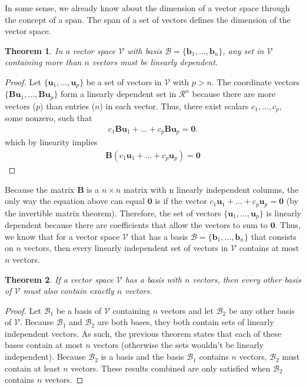 \documentclass[
]{book}
\newtheorem{theorem}{Theorem}[chapter]
\theoremstyle{definition}
\theoremstyle{definition}
\theoremstyle{definition}
\theoremstyle{definition}
\theoremstyle{remark}
\begin{document}
In some sense, we already know about the dimension of a vector space through the concept of a span. The span of a set of vectors defines the dimension of the vector space.

\begin{theorem}
In a vector space \(\mathcal{V}\) with basis \(\mathcal{B} = \{ \mathbf{b}_1, \ldots, \mathbf{b}_n\}\), any set in \(\mathcal{V}\) containing more than \(n\) vectors must be linearly dependent.
\end{theorem}

\begin{proof}
Let \(\{\mathbf{u}_1, \ldots, \mathbf{u}_p \}\) be a set of vectors in \(\mathcal{V}\) with \(p > n\). The coordinate vectors \(\{\mathbf{B} \mathbf{u}_1, \ldots, \mathbf{B} \mathbf{u}_p\}\) form a linearly dependent set in \(\mathcal{R}^n\) because there are more vectors (\(p\)) than entries (\(n\)) in each vector. Thus, there exist scalars \(c_1, \ldots, c_p\), some nonzero, such that
\[
\begin{aligned}
c_1 \mathbf{B} \mathbf{u}_1 + \ldots + c_p \mathbf{B} \mathbf{u}_p = \mathbf{0}.
\end{aligned}
\]
which by linearity implies
\[
\begin{aligned}
\mathbf{B} (c_1 \mathbf{u}_1 + \ldots + c_p \mathbf{u}_p) = \mathbf{0} 
\end{aligned}
\]
\end{proof}

Because the matrix \(\mathbf{B}\) is a \(n \times n\) matrix with n linearly independent columns, the only way the equation above can equal \(\mathbf{0}\) is if the vector \(c_1 \mathbf{u}_1 + \ldots + c_p \mathbf{u}_p = \mathbf{0}\) (by the invertible matrix theorem). Therefore, the set of vectors \(\{\mathbf{u}_1, \ldots, \mathbf{u}_p \}\) is linearly dependent because there are coefficients that allow the vectors to sum to \(\mathbf{0}\). Thus, we know that for a vector space \(\mathcal{V}\) that has a basis \({\mathcal{B} = \{ \mathbf{b}_1, \ldots, \mathbf{b}_n \}}\) that consists on \(n\) vectors, then every linearly independent set of vectors in \(\mathcal{V}\) contains at most \(n\) vectors.

\begin{theorem}
If a vector space \({\mathcal{V}}\) has a basis with \(n\) vectors, then every other basis of \({\mathcal{V}}\) must also contain exactly \(n\) vectors.
\end{theorem}

\begin{proof}
Let \(\mathcal{B}_1\) be a basis of \({\mathcal{V}}\) containing \(n\) vectors and let \(\mathcal{B}_2\) be any other basis of \({\mathcal{V}}\). Because \(\mathcal{B}_1\) and \(\mathcal{B}_2\) are both bases, they both contain sets of linearly independent vectors. As such, the previous theorem states that each of these bases contain at most \(n\) vectors (otherwise the sets wouldn't be linearly independent). Because \(\mathcal{B}_2\) is a basis and the basis \(\mathcal{B}_1\) contains \(n\) vectors, \(\mathcal{B}_2\) must contain at least \(n\) vectors. These results combined are only satisfied when \(\mathcal{B}_2\) contains \(n\) vectors.
\end{proof}
\end{document}
